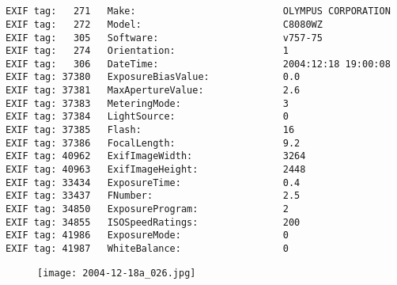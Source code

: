 \section{\protect{}}
\noindent 
\noindent
\begin{lstlisting}
EXIF tag:   271   Make:                          OLYMPUS CORPORATION
EXIF tag:   272   Model:                         C8080WZ
EXIF tag:   305   Software:                      v757-75
EXIF tag:   274   Orientation:                   1
EXIF tag:   306   DateTime:                      2004:12:18 19:00:08
EXIF tag: 37380   ExposureBiasValue:             0.0
EXIF tag: 37381   MaxApertureValue:              2.6
EXIF tag: 37383   MeteringMode:                  3
EXIF tag: 37384   LightSource:                   0
EXIF tag: 37385   Flash:                         16
EXIF tag: 37386   FocalLength:                   9.2
EXIF tag: 40962   ExifImageWidth:                3264
EXIF tag: 40963   ExifImageHeight:               2448
EXIF tag: 33434   ExposureTime:                  0.4
EXIF tag: 33437   FNumber:                       2.5
EXIF tag: 34850   ExposureProgram:               2
EXIF tag: 34855   ISOSpeedRatings:               200
EXIF tag: 41986   ExposureMode:                  0
EXIF tag: 41987   WhiteBalance:                  0

\end{lstlisting}
\clearpage
\begin{figure}
\raggedleft
\texttt{[image: 2004-12-18a\_026.jpg]}
\end{figure}


\clearpage
